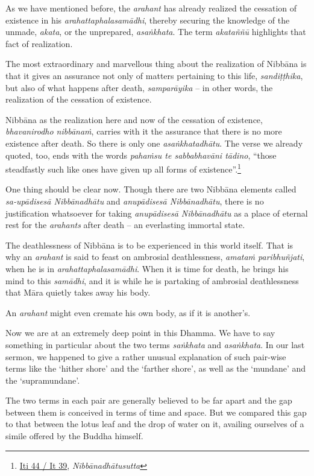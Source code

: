 As we have mentioned before, the \emph{arahant} has already realized the cessation of existence in his \emph{arahattaphalasamādhi}, thereby securing the knowledge of the unmade, \emph{akata}, or the unprepared, \emph{asaṅkhata}. The term \emph{akataññū} highlights that fact of realization.

The most extraordinary and marvellous thing about the realization of Nibbāna is that it gives an assurance not only of matters pertaining to this life, \emph{sandiṭṭhika}, but also of what happens after death, \emph{samparāyika} -- in other words, the realization of the cessation of existence.

Nibbāna as the realization here and now of the cessation of existence, \emph{bhavanirodho nibbānaṁ}, carries with it the assurance that there is no more existence after death. So there is only one \emph{asaṅkhatadhātu}. The verse we already quoted, too, ends with the words \emph{pahaṁsu te sabbabhavāni tādino}, ``those steadfastly such like ones have given up all forms of existence''.\footnote{\href{https://suttacentral.net/iti44/pli/ms}{Iti 44 / It 39}, \emph{Nibbānadhātusutta}}

One thing should be clear now. Though there are two Nibbāna elements called \emph{sa-upādisesā Nibbānadhātu} and \emph{anupādisesā Nibbānadhātu}, there is no justification whatsoever for taking \emph{anupādisesā Nibbānadhātu} as a place of eternal rest for the \emph{arahants} after death -- an everlasting immortal state.

The deathlessness of Nibbāna is to be experienced in this world itself. That is why an \emph{arahant} is said to feast on ambrosial deathlessness, \emph{amataṁ paribhuñjati}, when he is in \emph{arahattaphalasamādhi}. When it is time for death, he brings his mind to this \emph{samādhi}, and it is while he is partaking of ambrosial deathlessness that Māra quietly takes away his body.

An \emph{arahant} might even cremate his own body, as if it is another's.

Now we are at an extremely deep point in this Dhamma. We have to say something in particular about the two terms \emph{saṅkhata} and \emph{asaṅkhata}. In our last sermon, we happened to give a rather unusual explanation of such pair-wise terms like the `hither shore' and the `farther shore', as well as the `mundane' and the `supramundane'.

The two terms in each pair are generally believed to be far apart and the gap between them is conceived in terms of time and space. But we compared this gap to that between the lotus leaf and the drop of water on it, availing ourselves of a simile offered by the Buddha himself.

